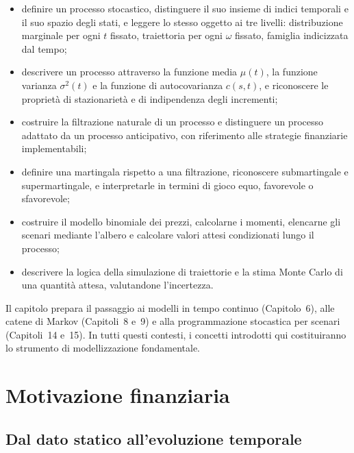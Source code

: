 \begin{itemize}
 
\item definire un processo stocastico, distinguere il suo insieme di
indici temporali e il suo spazio degli stati, e leggere lo stesso
oggetto ai tre livelli: distribuzione marginale per ogni $t$ fissato,
traiettoria per ogni $\omega$ fissato, famiglia indicizzata dal tempo;
 
\item descrivere un processo attraverso la funzione media $\mu(t)$, la
funzione varianza $\sigma^2(t)$ e la funzione di autocovarianza
$c(s,t)$, e riconoscere le propriet\`{a} di stazionariet\`{a} e di
indipendenza degli incrementi;
 
\item costruire la filtrazione naturale di un processo e distinguere
un processo adattato da un processo anticipativo, con riferimento alle
strategie finanziarie implementabili;
 
\item definire una martingala rispetto a una filtrazione, riconoscere
submartingale e supermartingale, e interpretarle in termini di gioco
equo, favorevole o sfavorevole;
 
\item costruire il modello binomiale dei prezzi, calcolarne i momenti,
elencarne gli scenari mediante l'albero e calcolare valori attesi
condizionati lungo il processo;
 
\item descrivere la logica della simulazione di traiettorie e la stima
Monte Carlo di una quantit\`{a} attesa, valutandone l'incertezza.

\end{itemize}

Il capitolo prepara il passaggio ai modelli in tempo continuo
(Capitolo~6), alle catene di Markov (Capitoli~8 e~9) e alla
programmazione stocastica per scenari (Capitoli~14 e~15). In tutti
questi contesti, i concetti introdotti qui costituiranno lo strumento
di modellizzazione fondamentale.


\section{Motivazione finanziaria}

\subsection{Dal dato statico all'evoluzione temporale}

